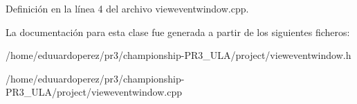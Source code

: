 Definición en la línea 4 del archivo vieweventwindow.\+cpp.



La documentación para esta clase fue generada a partir de los siguientes ficheros\+:\begin{DoxyCompactItemize}
\item 
/home/eduuardoperez/pr3/championship-\/\+P\+R3\+\_\+\+U\+L\+A/project/vieweventwindow.\+h\item 
/home/eduuardoperez/pr3/championship-\/\+P\+R3\+\_\+\+U\+L\+A/project/vieweventwindow.\+cpp\end{DoxyCompactItemize}
